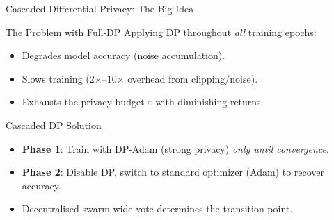 \documentclass[aspectratio=169]{beamer}
\begin{document}
\begin{frame}{Cascaded Differential Privacy: The Big Idea}
\begin{alertblock}{The Problem with Full‑DP}
Applying DP throughout \emph{all} training epochs:
\begin{itemize}
    \item Degrades model accuracy (noise accumulation).
    \item Slows training (2×–10× overhead from clipping/noise).
    \item Exhausts the privacy budget $\varepsilon$ with diminishing returns.
\end{itemize}
\end{alertblock}

\pause
\begin{exampleblock}{Cascaded DP Solution}
\begin{itemize}
    \item \textbf{Phase 1}: Train with DP-Adam (strong privacy) \emph{only until convergence}.
    \item \textbf{Phase 2}: Disable DP, switch to standard optimizer (Adam) to recover accuracy.
    \item Decentralised swarm‑wide vote determines the transition point.
\end{itemize}
\end{exampleblock}
\end{frame}
\end{document}
